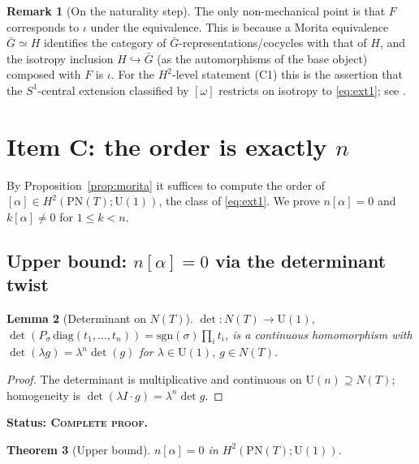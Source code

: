\documentclass[11pt]{article}
\newtheorem{theorem}{Theorem}[section]
\newtheorem{lemma}[theorem]{Lemma}
\theoremstyle{definition}
\newtheorem{remark}[theorem]{Remark}
\newcommand{\U}{\mathrm{U}}
\newcommand{\PN}{\mathrm{PN}}
\newcommand{\Nt}{N(T)}
\newcommand{\STAT}[1]{\noindent\textbf{Status: #1}}
\newcommand{\COMPLETE}{\textsc{Complete proof}}
\begin{document}
\begin{remark}[On the naturality step]
The only non-mechanical point is that $F$ corresponds to $\iota$ under the equivalence. This
is because a Morita equivalence $\bar G\simeq H$ identifies the category of $\bar
G$-representations/cocycles with that of $H$, and the isotropy inclusion $H\hookrightarrow
\bar G$ (as the automorphisms of the base object) composed with $F$ is $\iota$. For the
$H^2$-level statement (C1) this is the assertion that the $S^1$-central extension classified
by $[\omega]$ restricts on isotropy to \eqref{eq:ext1}; see \cite[Prop.~3.10]{BehrendXu}.
\end{remark}

\section{Item C: the order is exactly $n$}\label{sec:C}

By Proposition~\ref{prop:morita} it suffices to compute the order of $[\alpha]\in
H^2(\PN(T);\U(1))$, the class of \eqref{eq:ext1}. We prove $n[\alpha]=0$ and
$k[\alpha]\neq0$ for $1\le k<n$.

\subsection{Upper bound: $n[\alpha]=0$ via the determinant twist}

\begin{lemma}[Determinant on $\Nt$]\label{lem:det}
$\det\colon\Nt\to\U(1)$, $\det(P_\sigma\,\mathrm{diag}(t_1,\dots,t_n))=\mathrm{sgn}(\sigma)
\prod_i t_i$, is a continuous homomorphism with $\det(\lambda g)=\lambda^{n}\det(g)$ for
$\lambda\in\U(1)$, $g\in\Nt$.
\end{lemma}
\begin{proof}
The determinant is multiplicative and continuous on $\U(n)\supseteq\Nt$; homogeneity is
$\det(\lambda I\cdot g)=\lambda^n\det g$.
\end{proof}
\STAT{\COMPLETE.}

\begin{theorem}[Upper bound]\label{thm:upper}
$n[\alpha]=0$ in $H^2(\PN(T);\U(1))$.
\end{theorem}
\end{document}
